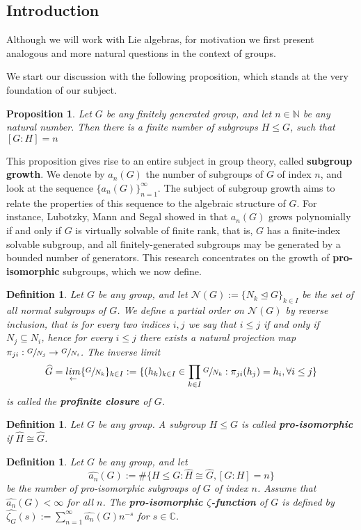 \documentclass[12pt]{article}
\newtheorem{proposition}[theorem]{Proposition}
\newtheorem{definition}[theorem]{Definition}
\begin{document}
\subsection{Introduction}
Although we will work with Lie algebras, for motivation we first present analogous and more natural questions in the context of groups.\par
We start our discussion with the following proposition, which stands at the very foundation of our subject.
\begin{proposition} \label{prop:finite.number.subgroups}
Let $G$ be any finitely generated group, and let $n\in\mathbb{N}$ be any natural number. Then there is a finite number of subgroups $H\leq G$, such that $[G:H]=n$
\end{proposition}
This proposition gives rise to an entire subject in group theory, called \textbf{subgroup growth}. We denote by $a_n(G)$ the number of subgroups of $G$ of index $n$, and look at the sequence $\{a_n(G)\}_{n=1}^{\infty}$. The subject of subgroup growth aims to relate the properties of this sequence to the algebraic structure of $G$. For instance, Lubotzky, Mann and Segal showed in \cite{LubotzkyMannSegal} that $a_n(G)$ grows polynomially if and only if $G$ is virtually solvable of finite rank, that is, $G$ has a finite-index solvable subgroup, and all finitely-generated subgroups may be generated by a bounded number of generators. This research concentrates on the growth of \textbf{pro-isomorphic} subgroups, which we now define.
\begin{definition}
\label{def:profinite.closure}
Let $G$ be any group, and let $\mathcal{N}(G):=\{N_k\trianglelefteq G\}_{k\in I}$ be the set of all normal subgroups of $G$. We define a partial order on $\mathcal{N}(G)$ by reverse inclusion, that is for every two indices $i,j$ we say that $i\leq j$ if and only if $N_j\subseteq N_i$, hence for every $i\leq j$ there exists a natural projection map $\pi_{ji}:\sfrac{G}{N_
j}\rightarrow\sfrac{G}{N_i}$. The inverse limit \[\widehat{G}=\underset{\leftarrow}{lim}\{\sfrac{G}{N_k}\}_{k\in I}:=\{(h_k)_{k\in I}\in\prod_{k\in I}\sfrac{G}{N_k} : \pi_{ji}(h_j)=h_i,\forall i\leq j\}\] is called the \textbf{profinite closure} of $G$.
\end{definition}
\begin{definition}
\label{def:pro.isomorphic}
Let $G$ be any group. A subgroup $H\leq G$ is called \textbf{pro-isomorphic} if $\widehat{H}\cong\widehat{G}$.
\end{definition}
\begin{definition}
\label{def:zeta.pro.isomorphic}
Let $G$ be any group, and let \[\hat{a_n}(G):=\#\{H\leq G : \widehat{H}\cong\widehat{G}, [G:H]=n\}\] be the number of pro-isomorphic subgroups of $G$ of index $n$. Assume that $\hat{a_n}(G)<\infty$ for all $n$. The \textbf{pro-isomorphic $\zeta$-function} of $G$ is defined by $\hat{\zeta_G}(s):=\sum_{n=1}^{\infty}\hat{a_n}(G)n^{-s}$ for $s\in\mathbb{C}$.
\end{definition}
\end{document}
